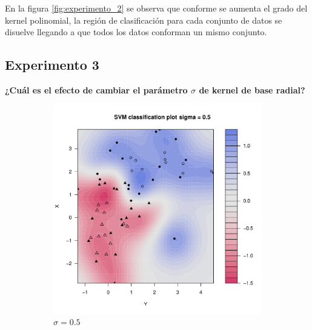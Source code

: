 En la figura \ref{fig:experimento_2} se observa que conforme se aumenta el grado del kernel polinomial, la región de clasificación para cada conjunto de datos se disuelve llegando a que todos los datos conforman un mismo conjunto.

\subsection*{Experimento 3}

\textbf{¿Cuál es el efecto de cambiar el parámetro $\sigma$ de kernel de base radial?}

\begin{figure}[H]
	\centering
	\begin{subfigure}{0.24\linewidth}
		\includegraphics[width=1\linewidth]{Graphics/Problema_01/Experiment_03_1.pdf}
		\caption{$\sigma=0.5$}
	\end{subfigure}
	\begin{subfigure}{0.24\linewidth}

\end{subfigure}
\end{figure}

